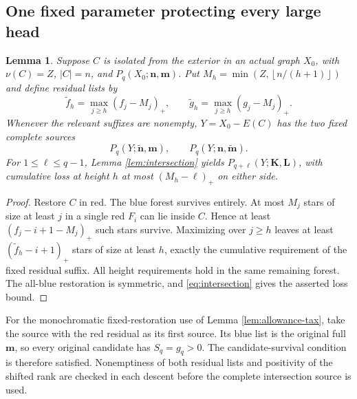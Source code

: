 \documentclass[11pt,a4paper]{article}
\newcommand{\nn}{\mathbf n}\newcommand{\mm}{\mathbf m}
\newcommand{\floor}[1]{\left\lfloor#1\right\rfloor}
\newtheorem{lemma}[theorem]{Lemma}
\theoremstyle{definition}
\begin{document}
\subsection{One fixed parameter protecting every large head}
\begin{lemma}\label{lem:fixed-restoration}
Suppose $C$ is isolated from the exterior in an actual graph $X_0$, with $\nu(C)=Z$, $|C|=n$, and $P_q(X_0;\nn,\mm)$. Put $M_h=\min(Z,\floor{n/(h+1)})$ and define residual lists by
\[
\widetilde f_h=\max_{j\ge h}(f_j-M_j)_+,\qquad
\widetilde g_h=\max_{j\ge h}(g_j-M_j)_+.
\]
Whenever the relevant suffixes are nonempty, $Y=X_0-E(C)$ has the two fixed complete sources
\[
P_q(Y;\widetilde{\nn},\mm),\qquad
P_q(Y;\nn,\widetilde{\mm}).
\]
For $1\le\ell\le q-1$, Lemma \ref{lem:intersection} yields
$P_{q+\ell}(Y;\mathbf K,\mathbf L)$, with cumulative loss at height $h$ at most $(M_h-\ell)_+$ on either side.
\end{lemma}
\begin{proof}
Restore $C$ in red. The blue forest survives entirely. At most $M_j$ stars of size at least $j$ in a single red $F_i$ can lie inside $C$. Hence at least
$(f_j-i+1-M_j)_+$ such stars survive. Maximizing over $j\ge h$ leaves at least
$(\widetilde f_h-i+1)_+$ stars of size at least $h$, exactly the cumulative requirement of the fixed residual suffix. All height requirements hold in the same remaining forest. The all-blue restoration is symmetric, and \eqref{eq:intersection} gives the asserted loss bound.
\end{proof}

For the monochromatic fixed-restoration use of Lemma \ref{lem:allowance-tax},
take the source with the red residual as its first source. Its blue list is
the original full $\mm$, so every original candidate has $S_q=g_q>0$.
The candidate-survival condition is therefore satisfied. Nonemptiness of both residual lists and positivity of the shifted rank are checked in each descent before the complete intersection source is used.
\end{document}
